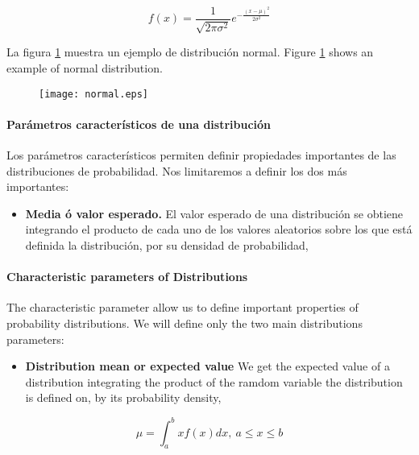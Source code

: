 \begin{equation*}
f(x)=\frac{1}{\sqrt{2\pi\sigma^2}}e^{-\frac{(x-\mu)^2}{2\sigma^2}}
\end{equation*}
\begin{paracol}{2}
\noindent La figura \ref{fig:normal} muestra un ejemplo de distribución normal.
\switchcolumn
\noindent Figure \ref{fig:normal} shows an example of normal distribution.
\end{paracol}
\begin{figure}
\centering
\texttt{[image: normal.eps]}
\label{fig:normal}
\end{figure}
\begin{paracol}{2}
\paragraph{Parámetros característicos de una distribución}

Los parámetros característicos permiten definir propiedades importantes de las distribuciones de probabilidad. Nos limitaremos a definir los dos más importantes:
\begin{itemize}
\item \textbf{Media ó valor esperado.} El valor esperado de una distribución se obtiene integrando el producto de cada uno de los valores aleatorios sobre los que está definida la distribución, por su densidad de probabilidad,
\end{itemize}
\switchcolumn
\paragraph{Characteristic parameters of Distributions}
The characteristic parameter  allow us to define important properties of probability distributions. We will define only the two main distributions parameters:
\begin{itemize}
	\item \textbf{Distribution mean or expected value} We get the expected value of a distribution integrating the product of the ramdom variable the distribution is defined on, by its probability density,   
\end{itemize}
\end{paracol}
\begin{equation*}
\mu = \int_a^b xf(x)dx, \ a\leqslant x \leqslant b
\end{equation*}
